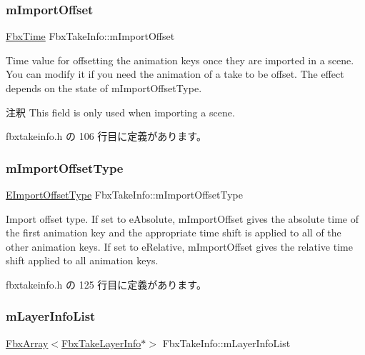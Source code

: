 \subsubsection{\texorpdfstring{m\+Import\+Offset}{mImportOffset}}
{\footnotesize\ttfamily \hyperlink{class_fbx_time}{Fbx\+Time} Fbx\+Take\+Info\+::m\+Import\+Offset}

Time value for offsetting the animation keys once they are imported in a scene. You can modify it if you need the animation of a take to be offset. The effect depends on the state of {\ttfamily m\+Import\+Offset\+Type}. \begin{DoxyRemark}{注釈}
This field is only used when importing a scene. 
\end{DoxyRemark}


 fbxtakeinfo.\+h の 106 行目に定義があります。

\mbox{\label{class_fbx_take_info_a91754fee6b84796e781b532661cfb2bd}} 
\subsubsection{\texorpdfstring{m\+Import\+Offset\+Type}{mImportOffsetType}}
{\footnotesize\ttfamily \hyperlink{class_fbx_take_info_a64a38a536155104dfa7bc79ffb7ef8dc}{E\+Import\+Offset\+Type} Fbx\+Take\+Info\+::m\+Import\+Offset\+Type}

Import offset type. If set to {\ttfamily e\+Absolute}, {\ttfamily m\+Import\+Offset} gives the absolute time of the first animation key and the appropriate time shift is applied to all of the other animation keys. If set to {\ttfamily e\+Relative}, {\ttfamily m\+Import\+Offset} gives the relative time shift applied to all animation keys. 

 fbxtakeinfo.\+h の 125 行目に定義があります。

\mbox{\label{class_fbx_take_info_a5e71a2f2ecb6d90473d7a2b63c91b175}} 
\subsubsection{\texorpdfstring{m\+Layer\+Info\+List}{mLayerInfoList}}
{\footnotesize\ttfamily \hyperlink{class_fbx_array}{Fbx\+Array}$<$\hyperlink{struct_fbx_take_layer_info}{Fbx\+Take\+Layer\+Info}$\ast$$>$ Fbx\+Take\+Info\+::m\+Layer\+Info\+List}



